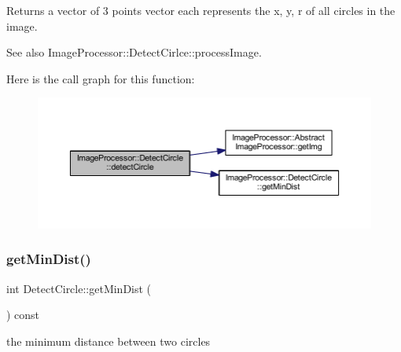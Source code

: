 \begin{DoxyReturn}{Returns}
a vector of 3 points vector each represents the x, y, r of all circles in the image. 
\end{DoxyReturn}
\begin{DoxySeeAlso}{See also}
Image\+Processor\+::\+Detect\+Cirlce\+::process\+Image. 
\end{DoxySeeAlso}
Here is the call graph for this function\+:\nopagebreak
\begin{figure}[H]
\begin{center}
\leavevmode
\includegraphics[width=350pt]{d6/d8e/class_image_processor_1_1_detect_circle_a6324c8bfcc4e8df8d584a037250b22b2_cgraph}
\end{center}
\end{figure}
\mbox{\label{class_image_processor_1_1_detect_circle_a9e83f089602650f7afcb97172a23f329}} 
\subsubsection{\texorpdfstring{get\+Min\+Dist()}{getMinDist()}}
{\footnotesize\ttfamily int Detect\+Circle\+::get\+Min\+Dist (\begin{DoxyParamCaption}{ }\end{DoxyParamCaption}) const}



the minimum distance between two circles 


